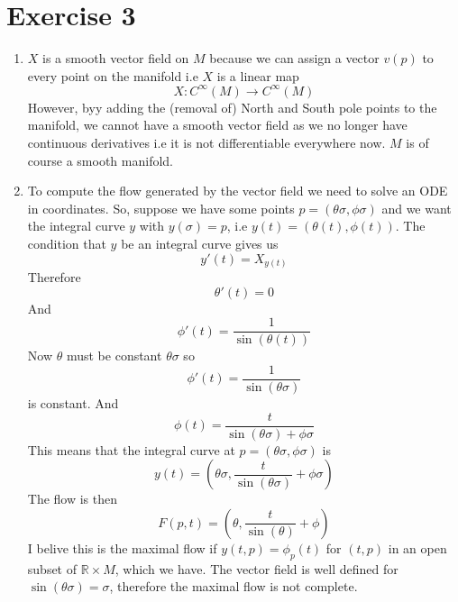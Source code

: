 \documentclass[12pt]{article}
\begin{document}
\section*{Exercise 3}
\begin{enumerate}
  \item $X$ is a smooth vector field on $M$ because we can assign a vector $v (p)$ to every point on the manifold i.e $X$ is a linear map 
  $$ X: C^{\infty} (M) \rightarrow C^{\infty} (M) $$ 
  However, byy adding the (removal of) North and South pole points to the manifold, we cannot have a smooth vector field as we no longer have continuous derivatives i.e it is not differentiable everywhere now. $M$ is of course a smooth manifold. 

  \item To compute the flow generated by the vector field we need to solve  an ODE in coordinates. So, suppose we have some points $p = (\theta \sigma, \phi \sigma)$ and we want the integral curve $y$ with $y (\sigma) = p$, i.e $y(t) = (\theta (t), \phi (t) )$. The condition that $y$ be an integral curve gives us 
  $$ y' (t) = X_{y(t)} $$
  Therefore 
  $$ \theta' (t) = 0 $$
  And 
  $$ \phi' (t) = \frac{1}{\sin(\theta (t))} $$
  Now $\theta$ must be constant $\theta \sigma$ so 
  $$ \phi' (t) = \frac{1}{\sin(\theta \sigma)} $$
  is constant. And 
  $$ \phi (t) = \frac{t}{\sin(\theta \sigma) + \phi \sigma} $$
  This means that the integral curve at $p = (\theta \sigma, \phi \sigma)$ is 
  $$ y(t) = (\theta \sigma, \frac{t}{\sin (\theta \sigma) } + \phi \sigma) $$
  The flow is then 
  $$ F(p, t) = (\theta, \frac{t}{\sin(\theta)} + \phi ) $$
  I belive this is the maximal flow if $y(t,p) =  \phi_p (t)$ for $(t,p)$ in an open subset of $\mathbb{R} \times M$, which we have. The vector field is well defined for $\sin (\theta \sigma) = \sigma $, therefore the maximal flow is not complete. 
\end{enumerate}
\end{document}
